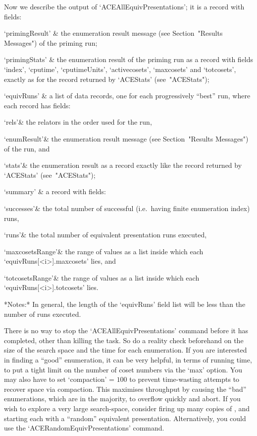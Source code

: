 Now we describe the output  of  `ACEAllEquivPresentations';  it  is  a
record with fields:

\beginitems

\quad`primingResult' & the  {\ACE}  enumeration  result  message  (see
Section~"Results Messages") of the priming run;

\quad`primingStats' & the enumeration result of the priming run  as  a
{\GAP}  record  with  fields   `index',   `cputime',   `cputimeUnits',
`activecosets', `maxcosets' and `totcosets', exactly as for the record
returned by `ACEStats' (see~"ACEStats");

\quad`equivRuns' & a list of data records, one for each  progressively
``best'' run, where each record has fields:

\qquad`rels'& the relators in the order used for the run,

\qquad`enumResult'&  the  {\ACE}  enumeration  result   message   (see
Section~"Results Messages") of the run, and

\qquad`stats'& the enumeration result as a {\GAP} record exactly  like
the record returned by `ACEStats' (see~"ACEStats");

\quad`summary' & a record with fields:

\qquad`successes'& the total number of successful (i.e.~having  finite
enumeration index) runs,

\qquad`runs'&  the  total  number  of  equivalent  presentation   runs
executed,

\qquad`maxcosetsRange'& the range of values as a  {\GAP}  list  inside
which each `equivRuns[<i>].maxcosets' lies, and

\qquad`totcosetsRange'& the range of values as a  {\GAP}  list  inside
which each `equivRuns[<i>].totcosets' lies.

\enditems

*Notes:*
In general, the length of the `equivRuns' field list will be less than
the number of runs executed.

There is no way to stop the `ACEAllEquivPresentations' command  before
it has completed, other than killing the task. So do a  reality  check
beforehand on the size of the search  space  and  the  time  for  each
enumeration. If you are interested in finding a ``good''  enumeration,
it can be very helpful, in terms of running time, to put a tight limit
on the number of coset numbers via the `max' option. You may also have
to set `compaction'  =  $100$  to  prevent  time-wasting  attempts  to
recover space via compaction. This maximises throughput by causing the
``bad'' enumerations, which are in the majority, to  overflow  quickly
and abort. If you wish to explore a very large search-space,  consider
firing up many copies of {\ACE}, and starting each with  a  ``random''
equivalent   presentation.   Alternatively,   you   could   use    the
`ACERandomEquivPresentations' command.


